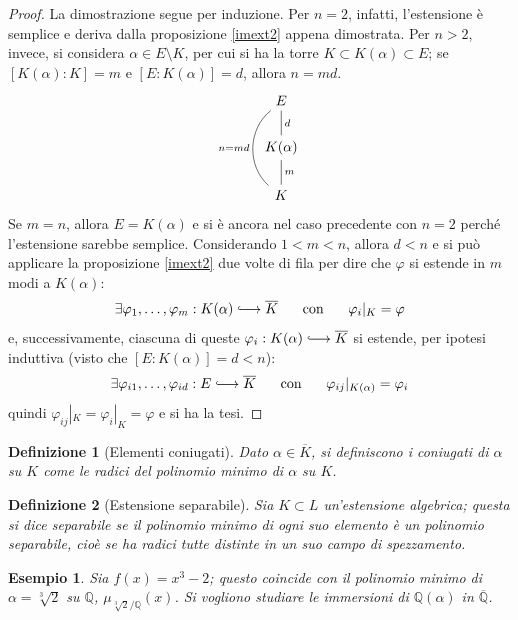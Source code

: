 \documentclass[12pt]{scrartcl}
\theoremstyle{style}
\newtheorem{esempio}{Esempio}[section]
\newtheorem{definizione}{Definizione}[section]
\numberwithin{equation}{subsection}
\newcommand{\longhookrightarrow}{\lhook\joinrel\longrightarrow}
\begin{document}
\begin{proof}
	La dimostrazione segue per induzione.
	Per $n=2$, infatti, l'estensione \`e semplice e deriva dalla proposizione \ref{imext2} appena dimostrata.
	Per $n>2$, invece, si considera $\alpha  \in  E \setminus K$, per cui si ha la torre $K \subset K(\alpha ) \subset E$; se $[K(\alpha ):K] = m$ e $[E:K(\alpha )] = d$, allora $n = md$.
	\[
	\begin{tikzcd}
		 E \\
		 K(\alpha )\\
		 K
		 \arrow[from=3-1, to=2-1, no head, "m"']
		 \arrow[from=2-1, to=1-1, no head, "d"']
		 \arrow[from=3-1, to=1-1, no head, bend left=50, "n = md"]
	\end{tikzcd}
	\] 
	Se $m=n$, allora $E = K(\alpha )$ e si \`e ancora nel caso precedente con $n=2$ perch\'e l'estensione sarebbe semplice.
	Considerando $1<m<n$, allora $d < n$ e si pu\`o applicare la proposizione \ref{imext2} due volte di fila per dire che $\varphi $ si estende in $m$ modi a $K(\alpha )$:
	\[
	\exists \varphi _1,\ldots,\varphi _m : K(\alpha )\longhookrightarrow \overline{K} \hspace{.5cm} \text{ con } \hspace{.5cm} \varphi _i|_K = \varphi 
	\] 
	e, successivamente, ciascuna di queste $\varphi _i:K(\alpha ) \longhookrightarrow \overline{K}$ si estende, per ipotesi induttiva (visto che $[E:K(\alpha )] = d < n$):
	\[
	\exists \varphi _{i1} ,\ldots, \varphi _{i d } : E \longhookrightarrow \overline{K} \hspace{.5cm} \text{ con } \hspace{.5cm} \varphi _{ij} |_{K(\alpha )} = \varphi _i
	\] 
	quindi $\varphi _{ij} |_K = \varphi _i|_K = \varphi $ e si ha la tesi.
\end{proof}
\begin{definizione}
	[Elementi coniugati]
	Dato $\alpha  \in \overline{K}$, si definiscono i \textit{coniugati} di $\alpha $ su $K$ come le radici del polinomio minimo di $\alpha $ su $K$.
\end{definizione}
\begin{definizione}
	[Estensione separabile]
	Sia $K \subset L$ un'estensione algebrica; questa si dice \textit{separabile} se il polinomio minimo di ogni suo elemento \`e un \textit{polinomio separabile}, cio\`e se ha radici tutte distinte in un suo campo di spezzamento.
\end{definizione}
\begin{esempio}
	Sia $f(x) = x^3 - 2$; questo coincide con il polinomio minimo di $\alpha = \sqrt[3]{2} $ su $\mathbb{Q}$, $\mu _{\sqrt[3]{2}/\mathbb{Q} } (x)$.
	Si vogliono studiare le immersioni di $\mathbb{Q}(\alpha )$ in $\overline{\mathbb{Q}}$.
\end{esempio}
\end{document}
